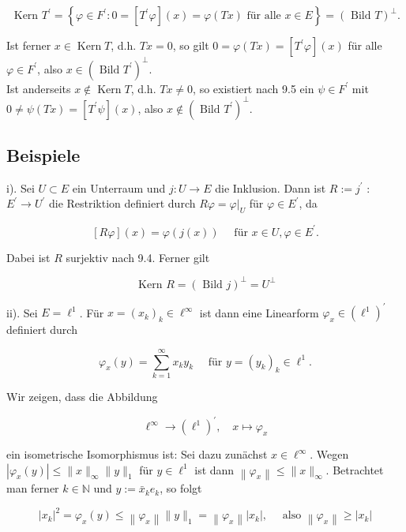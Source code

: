 \documentclass[10pt, letterpaper]{article}
\begin{document}
$$
\text { Kern } T^{\prime}=\left\{\varphi \in F^{\prime}: 0=\left[T^{\prime} \varphi\right](x)=\varphi(T x) \text { für alle } x \in E\right\}=(\text { Bild } T)^{\perp} .
$$

Ist ferner $x \in \operatorname{Kern} T$, d.h. $T x=0$, so gilt $0=\varphi(T x)=\left[T^{\prime} \varphi\right](x)$ für alle $\varphi \in F^{\prime}$, also $x \in\left(\text { Bild } T^{\prime}\right)^{\perp}$.\\
Ist anderseits $x \notin \operatorname{Kern} T$, d.h. $T x \neq 0$, so existiert nach 9.5 ein $\psi \in F^{\prime}$ mit $0 \neq \psi(T x)=\left[T^{\prime} \psi\right](x)$, also $x \notin\left(\text { Bild } T^{\prime}\right)^{\perp}$.

\subsection*{Beispiele}
i). Sei $U \subset E$ ein Unterraum und $j: U \rightarrow E$ die Inklusion. Dann ist $R:=j^{\prime}$ : $E^{\prime} \rightarrow U^{\prime}$ die Restriktion definiert durch $R \varphi=\left.\varphi\right|_{U}$ für $\varphi \in E^{\prime}$, da

$$
[R \varphi](x)=\varphi(j(x)) \quad \text { für } x \in U, \varphi \in E^{\prime} .
$$

Dabei ist $R$ surjektiv nach 9.4. Ferner gilt

$$
\text { Kern } R=(\text { Bild } j)^{\perp}=U^{\perp}
$$

ii). Sei $E=\ell^{1}$. Für $x=\left(x_{k}\right)_{k} \in \ell^{\infty}$ ist dann eine Linearform $\varphi_{x} \in\left(\ell^{1}\right)^{\prime}$ definiert durch

$$
\varphi_{x}(y)=\sum_{k=1}^{\infty} x_{k} y_{k} \quad \text { für } y=\left(y_{k}\right)_{k} \in \ell^{1} .
$$

Wir zeigen, dass die Abbildung

$$
\ell^{\infty} \rightarrow\left(\ell^{1}\right)^{\prime}, \quad x \mapsto \varphi_{x}
$$

ein isometrische Isomorphismus ist: Sei dazu zunächst $x \in \ell^{\infty}$. Wegen $\left|\varphi_{x}(y)\right| \leq \|x\|_{\infty}\|y\|_{1}$ für $y \in \ell^{1}$ ist dann $\left\|\varphi_{x}\right\| \leq\|x\|_{\infty}$. Betrachtet man ferner $k \in \mathbb{N}$ und $y:=\bar{x}_{k} e_{k}$, so folgt

$$
\left|x_{k}\right|^{2}=\varphi_{x}(y) \leq\left\|\varphi_{x}\right\|\|y\|_{1}=\left\|\varphi_{x}\right\|\left|x_{k}\right|, \quad \text { also }\left\|\varphi_{x}\right\| \geq\left|x_{k}\right|
$$
\end{document}
